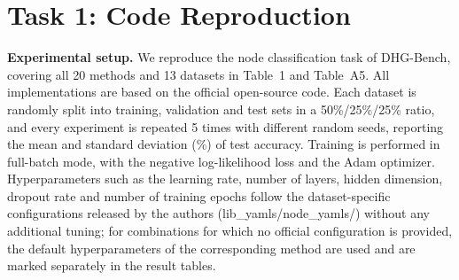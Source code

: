 
\section*{Task 1: Code Reproduction}
\textbf{Experimental setup.} We reproduce the node classification task of DHG-Bench, covering all 20 methods and 13 datasets in Table~1 and Table~A5. All implementations are based on the official open-source code. Each dataset is randomly split into training, validation and test sets in a 50\%/25\%/25\% ratio, and every experiment is repeated 5 times with different random seeds, reporting the mean and standard deviation (\%) of test accuracy. Training is performed in full-batch mode, with the negative log-likelihood loss and the Adam optimizer. Hyperparameters such as the learning rate, number of layers, hidden dimension, dropout rate and number of training epochs follow the dataset-specific configurations released by the authors (lib\_yamls/node\_yamls/) without any additional tuning; for combinations for which no official configuration is provided, the default hyperparameters of the corresponding method are used and are marked separately in the result tables.
\vspace{3em} 

